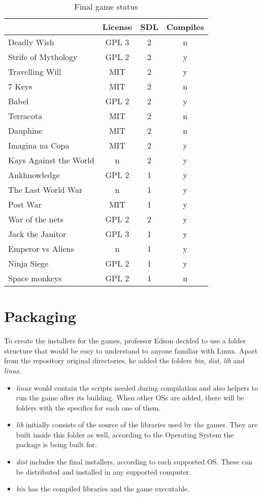 \begin{table}[h!]
\centering
\caption{Final game status}
\label{tab:final_games}
\begin{tabular}{lccc}
\hline
\textbf{} & \multicolumn{1}{l}{\textbf{License}} & \multicolumn{1}{l}{\textbf{SDL}} & \multicolumn{1}{l}{\textbf{Compiles}} \\ \hline
Deadly Wish & GPL 3 & 2 & n \\
Strife of Mythology & GPL 2 & 2 & y \\
Travelling Will & MIT & 2 & y \\
7 Keys & MIT & 2 & n \\
Babel & GPL 2 & 2 & y \\
Terracota & MIT & 2 & n \\
Dauphine & MIT & 2 & n \\
Imagina na Copa & MIT & 2 & y \\
Kays Against the World & n & 2 & y \\
Ankhnowledge & GPL 2 & 1 & y \\
The Last World War & n & 1 & y \\
Post War & MIT & 1 & y \\
War of the nets & GPL 2 & 2 & y \\
Jack the Janitor & GPL 3 & 1 & y \\
Emperor vs Aliens & n & 1 & y \\
Ninja Siege & GPL 2 & 1 & y \\
Space monkeys & GPL 2 & 1 & n \\ \hline
\end{tabular}
\end{table}


\section[Packaging]{Packaging}

To create the installers for the games, professor Edson decided to use a folder structure that would be easy to understand to anyone familiar with Linux. Apart from the repository original directories, he added the folders \textit{bin}, \textit{dist}, \textit{lib} and \textit{linux}.

\begin{itemize}
\item \textit{linux} would contain the scripts needed during compilation and also helpers to run the game after its building. When other OSs are added, there will be folders with the specifics for each one of them.
\item \textit{lib} initially consists of the source of the libraries used by the games. They are built inside this folder as well, according to the Operating System the package is being built for.
\item \textit{dist} includes the final installers, according to each supported OS. These can be distributed and installed in any supported computer.
\item \textit{bin} has the compiled libraries and the game executable.

\end{itemize}

